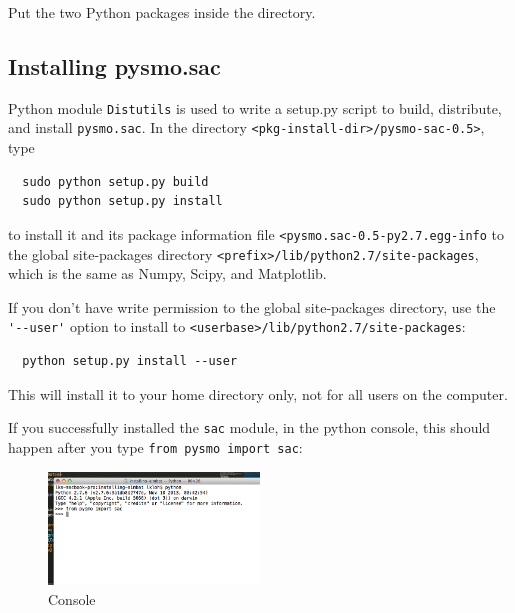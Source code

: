 \documentclass[letterpaper,10pt]{article}
\begin{document}
Put the two Python packages inside the directory.


\subsection{Installing pysmo.sac}

Python module \verb"Distutils" is used to write a setup.py script to build, distribute, and install \verb"pysmo.sac". In the directory \verb"<pkg-install-dir>/pysmo-sac-0.5>", type 

\begin{verbatim}
  sudo python setup.py build
  sudo python setup.py install
\end{verbatim}

to install it and its package information file \verb"<pysmo.sac-0.5-py2.7.egg-info" to the global site-packages directory \verb"<prefix>/lib/python2.7/site-packages", which is the same as Numpy, Scipy, and Matplotlib.

If you don't have write permission to the global site-packages directory, use the \verb"'--user'" option to install to \verb"<userbase>/lib/python2.7/site-packages":

\begin{verbatim}
  python setup.py install --user
\end{verbatim}

This will install it to your home directory only, not for all users on the computer. 

If you successfully installed the \verb"sac" module, in the python console, this should happen after you type \verb"from pysmo import sac": 

\begin{figure}[h!]
  \centering
  \includegraphics[width=0.5\textwidth]{images/sac_installed}
  \caption{Console}
  \label{fig:sac_installed}
\end{figure}

\end{document}

